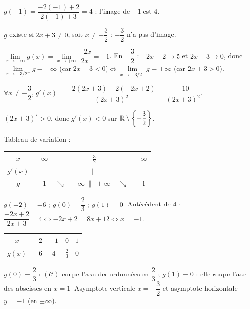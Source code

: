 \documentclass[11pt]{article}
\begin{document}
\begin{questions}
  \item \begin{sousq}
    \item $g(-1) = \dfrac{-2(-1)+2}{2(-1)+3} = 4$ : l'image de $-1$ est 4.
    \item $g$ existe si $2x + 3 \ne 0$, soit $x \ne -\dfrac{3}{2}$ : $-\dfrac{3}{2}$ n'a pas d'image.
  \end{sousq}
  \item $\lim\limits_{x\to+\infty} g(x) = \lim\limits_{x\to+\infty}\dfrac{-2x}{2x} = -1$. En $-\dfrac{3}{2}$ : $-2x+2 \to 5$ et $2x+3 \to 0$, donc $\lim\limits_{x\to-3/2^-} g = -\infty$ (car $2x+3 < 0$) et $\lim\limits_{x\to-3/2^+} g = +\infty$ (car $2x+3 > 0$).
  \item \begin{sousq}
    \item $\forall x \ne -\dfrac{3}{2}$, $g'(x) = \dfrac{-2(2x+3) - 2(-2x+2)}{(2x+3)^2} = \dfrac{-10}{(2x+3)^2}$.
    \item $(2x+3)^2 > 0$, donc $g'(x) < 0$ sur $\mathbb{R}\setminus\left\{-\dfrac{3}{2}\right\}$.
  \end{sousq}
  \item Tableau de variation :
  \begin{center}\renewcommand{\arraystretch}{1.4}
  \begin{tabular}{|c|ccccc|}
  \hline $x$ & $-\infty$ & & $-\frac{3}{2}$ & & $+\infty$ \\\hline
  $g'(x)$ & & $-$ & $\|$ & $-$ & \\\hline
  $g$ & $-1$ & $\searrow$ & $-\infty\ \|\ +\infty$ & $\searrow$ & $-1$ \\\hline
  \end{tabular}
  \end{center}
  \item $g(-2) = -6$ ; $g(0) = \dfrac{2}{3}$ ; $g(1) = 0$. Antécédent de 4 : $\dfrac{-2x+2}{2x+3} = 4 \Leftrightarrow -2x+2 = 8x+12 \Leftrightarrow x = -1$.
  \begin{center}\renewcommand{\arraystretch}{1.4}
  \begin{tabular}{|c|c|c|c|c|}
  \hline $x$ & $-2$ & $-1$ & $0$ & $1$ \\\hline $g(x)$ & $-6$ & $4$ & $\frac{2}{3}$ & $0$ \\\hline
  \end{tabular}
  \end{center}
  \item $g(0) = \dfrac{2}{3}$ : $(\mathcal{C})$ coupe l'axe des ordonnées en $\dfrac{2}{3}$ ; $g(1) = 0$ : elle coupe l'axe des abscisses en $x = 1$. Asymptote verticale $x = -\dfrac{3}{2}$ et asymptote horizontale $y = -1$ (en $\pm\infty$).

\end{questions}
\end{document}
